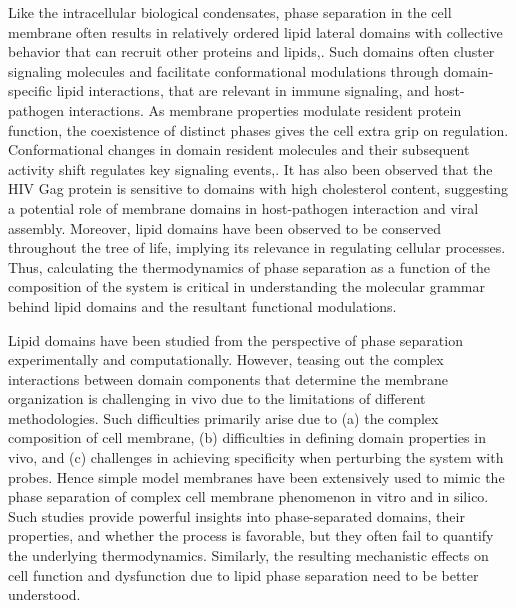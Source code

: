 \documentclass{biophys-new}
\begin{document}
Like the intracellular biological condensates, phase separation in the cell membrane often results in relatively ordered lipid lateral domains with collective behavior that can recruit other proteins and lipids\cite{Sezgin2017},\cite{Case2019}.
Such domains often cluster signaling molecules\cite{Tian2007} and facilitate conformational modulations through domain-specific lipid interactions\cite{Laganowsky2014},\cite{Lingwood2011} that are relevant in immune signaling\cite{Beck-garcia2015},\cite{Wisser2017} and host-pathogen interactions\cite{Dick2012}.
As membrane properties modulate resident protein function, the coexistence of distinct phases gives the cell extra grip on regulation.
Conformational changes in domain resident molecules and their subsequent activity shift regulates key signaling events\cite{Laganowsky2014},\cite{Lingwood2011}.
It has also been observed that the HIV Gag protein is sensitive to domains with high cholesterol content, suggesting a potential role of membrane domains in host-pathogen interaction and viral assembly\cite{Dick2012}.
Moreover, lipid domains have been observed to be conserved throughout the tree of life, implying its relevance in regulating cellular processes\cite{Sezgin2017}. 
Thus, calculating the thermodynamics of phase separation as a function of the composition of the system is critical in understanding the molecular grammar behind lipid domains and the resultant functional modulations. 


Lipid domains have been studied from the perspective of phase separation experimentally and computationally.
However, teasing out the complex interactions between domain components that determine the membrane organization is challenging in vivo due to the limitations of different methodologies\cite{Klotzsch2013}.
Such difficulties primarily arise due to (a) the complex composition of cell membrane\cite{Tieleman2019}, (b) difficulties in defining domain properties in vivo\cite{Sezgin2017}, and (c) challenges in achieving specificity when perturbing the system with probes\cite{Veatch2007}.
Hence simple model membranes have been extensively used to mimic the phase separation of complex cell membrane phenomenon in vitro\cite{Veatch2003a}\cite{Veatch2002}\cite{Veatch2003} and in silico\cite{Risselada2008}\cite{Lin2016}\cite{Lin2019}.
Such studies provide powerful insights into phase-separated domains, their properties, and whether the process is favorable, but they often fail to quantify the underlying thermodynamics.
Similarly, the resulting mechanistic effects on cell function and dysfunction due to lipid phase separation need to be better understood.
\end{document}
